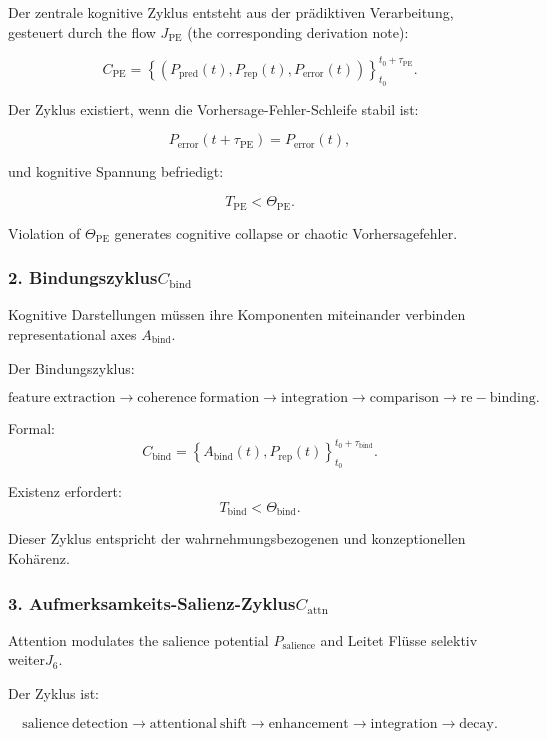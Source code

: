 Der zentrale kognitive Zyklus entsteht aus der prädiktiven Verarbeitung, gesteuert durch
the flow $J_{\mathrm{PE}}$ (the corresponding derivation note):

\[
 C_{\mathrm{PE}} =
 \left\{
   (P_{\mathrm{pred}}(t),
    P_{\mathrm{rep}}(t),
    P_{\mathrm{error}}(t))
 \right\}_{t_0}^{t_0+\tau_{\mathrm{PE}}}.
\]

Der Zyklus existiert, wenn die Vorhersage-Fehler-Schleife stabil ist:

\[
 P_{\mathrm{error}}(t+\tau_{\mathrm{PE}}) = P_{\mathrm{error}}(t),
\]

und kognitive Spannung befriedigt:

\[
 T_{\mathrm{PE}} < \Theta_{\mathrm{PE}}.
\]

Violation of $\Theta_{\mathrm{PE}}$ generates cognitive collapse or chaotic
Vorhersagefehler.

\subsubsection{2. Bindungszyklus$C_{\mathrm{bind}}$}

Kognitive Darstellungen müssen ihre Komponenten miteinander verbinden
representational axes $A_{\mathrm{bind}}$.

Der Bindungszyklus:

\[
 \mathrm{feature\ extraction}
 \to
 \mathrm{coherence\ formation}
 \to
 \mathrm{integration}
 \to
 \mathrm{comparison}
 \to
 \mathrm{re-binding}.
\]

Formal:
\[
 C_{\mathrm{bind}} =
 \left\{
   A_{\mathrm{bind}}(t), P_{\mathrm{rep}}(t)
 \right\}_{t_0}^{t_0+\tau_{\mathrm{bind}}}.
\]

Existenz erfordert:
\[
 T_{\mathrm{bind}} < \Theta_{\mathrm{bind}}.
\]

Dieser Zyklus entspricht der wahrnehmungsbezogenen und konzeptionellen Kohärenz.

\subsubsection{3. Aufmerksamkeits-Salienz-Zyklus$C_{\mathrm{attn}}$}

Attention modulates the salience potential $P_{\mathrm{salience}}$ and
Leitet Flüsse selektiv weiter$J_6$.

Der Zyklus ist:

\[
  \mathrm{salience\ detection}
  \to
  \mathrm{attentional\ shift}
  \to
  \mathrm{enhancement}
  \to
  \mathrm{integration}
  \to
  \mathrm{decay}.
\]

